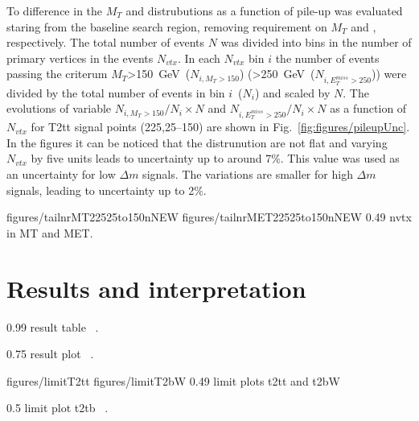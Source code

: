 To difference in the $M_{T}$ and \MET distrubutions as a function of pile-up was evaluated staring from the baseline search region, removing requirement on $M_{T}$ and \MET, respectively. The total number of events $N$ was divided into bins in the number of primary vertices in the events $N_{vtx}$. In each $N_{vtx}$ bin $i$ the number of events passing the criterum $M_{T}$>150~GeV~($N_{i,M_{T}>150}$) (\MET>250~GeV~($N_{i,E_{T}^{miss}>250}$)) were divided by the total number of events in bin $i$~($N_{i}$) and scaled by $N$. The evolutions of variable $N_{i,M_{T}>150}/N_{i} \times N$ and $N_{i,E_{T}^{miss}>250}/N_{i} \times N$ as a function of $N_{vtx}$ for T2tt signal points (225,25--150) are shown in Fig.~\ref{fig:figures/pileupUnc}. In the figures it can be noticed that  the distrunution are not flat and varying $N_{vtx}$ by five units leads to uncertainty up to around 7\%. This value was used as an uncertainty for low $\Delta m$ signals. The variations are smaller for high $\Delta m$ signals, leading to uncertainty up to 2\%.

                 {figures/tailnrMT22525to150nNEW} %
                 {figures/tailnrMET22525to150nNEW} %
                 {0.49}       %
                 { nvtx in MT and MET. }
\newpage
\section{Results and interpretation}


                 {0.99}       %
                 { result table ~\cite{Sirunyan:2017xse}. }

                 {0.75}       %
                 { result plot ~\cite{Sirunyan:2017xse}. }


                 {figures/limitT2tt} %
                 {figures/limitT2bW} %
                 {0.49}       %
                 { limit plots t2tt and t2bW  ~\cite{Sirunyan:2017xse}}

                 {0.5}       %
                 { limit plot t2tb ~\cite{Sirunyan:2017xse}. }

